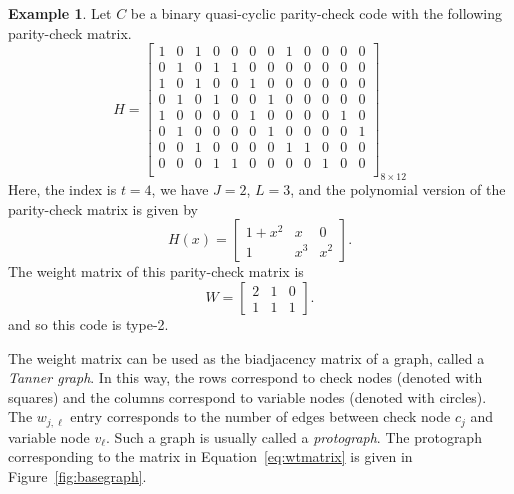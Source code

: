 \documentclass[11pt]{amsart}
\theoremstyle{definition}
\newtheorem{example}[theorem]{Example}
\newcommand{\0}{\mathbf{0}}
\begin{document}
\begin{example} \label{ex:polynomial-circulants}
    Let $C$ be a binary quasi-cyclic parity-check code with the following parity-check matrix.
    \begin{equation} \label{eq:qc-matrix}
    {H = \left[
        \begin{array}{cccc|cccc|cccc}
            1 & 0 & 1 & 0 & 0 & 0 & 0 & 1 & 0 & 0 & 0 & 0 \\
            0 & 1 & 0 & 1 & 1 & 0 & 0 & 0 & 0 & 0 & 0 & 0 \\
            1 & 0 & 1 & 0 & 0 & 1 & 0 & 0 & 0 & 0 & 0 & 0 \\
            0 & 1 & 0 & 1 & 0 & 0 & 1 & 0 & 0 & 0 & 0 & 0 \\
            \hline
            1 & 0 & 0 & 0 & 0 & 1 & 0 & 0 & 0 & 0 & 1 & 0 \\
            0 & 1 & 0 & 0 & 0 & 0 & 1 & 0 & 0 & 0 & 0 & 1 \\
            0 & 0 & 1 & 0 & 0 & 0 & 0 & 1 & 1 & 0 & 0 & 0 \\
            0 & 0 & 0 & 1 & 1 & 0 & 0 & 0 & 0 & 1 & 0 & 0 \\
        \end{array} \right]_{8 \times 12}}
    \end{equation}
    Here, the index is $t=4$, we have $J=2$, $L=3$, and the polynomial version of the parity-check matrix is given by
    \begin{equation} \label{eq:poly-matrix}
    H(x) = \begin{bmatrix} 1+x^2 & x & 0 \\ 1 & x^3 & x^2
    \end{bmatrix}.
    \end{equation}
    The weight matrix of this parity-check matrix is
    \begin{equation} \label{eq:wtmatrix}
        W = \begin{bmatrix} 2 & 1 & 0 \\ 1 & 1 & 1 \end{bmatrix}.
    \end{equation}
    and so this code is type-2.
\end{example}

The weight matrix can be used as the biadjacency matrix of a graph, called a \textit{Tanner graph}. In this way, the rows correspond to check nodes (denoted with squares) and the columns correspond to variable nodes (denoted with circles). The $w_{j,\ell}$ entry corresponds to the number of edges between check node $c_j$ and variable node $v_{\ell}$. Such a graph is usually called a \textit{protograph}. The protograph corresponding to the matrix in Equation~\ref{eq:wtmatrix} is given in Figure~\ref{fig:basegraph}.
\end{document}
